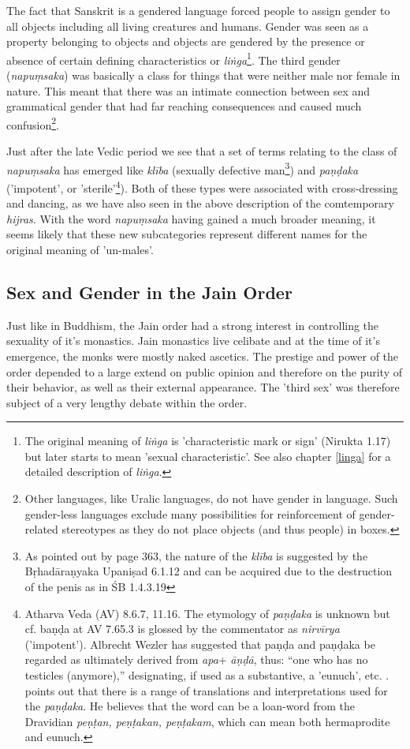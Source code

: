 The fact that Sanskrit is a gendered language forced people to assign gender to all objects including all living creatures and humans. Gender was seen as a property belonging to objects and objects are gendered by the presence or absence of certain defining characteristics or {\em liṅga}\footnote{The original meaning of {\em liṅga} is 'characteristic mark or sign' (Nirukta 1.17) but later starts to mean 'sexual characteristic'. See also chapter \ref{linga} for a detailed description of {\em liṅga}.}. The third gender ({\em napuṃsaka}) was basically a class for things that were neither male nor female in nature. This meant that there was an intimate connection between sex and grammatical gender that had far reaching consequences and caused much confusion\footnote{Other languages, like Uralic languages, do not have gender in language. Such gender-less languages exclude many possibilities for reinforcement of gender-related stereotypes as they do not place objects (and thus people) in boxes.}. 

Just after the late Vedic period we see that a set of terms relating to the class of {\em napuṃsaka} has emerged like {\em klība} (sexually defective man\footnote{As pointed out by \cite{zwilling} page 363, the nature of the {\em klība} is suggested by the Bṛhadāraṇyaka Upaniṣad 6.1.12 and can be acquired due to the destruction of the penis as in ŚB 1.4.3.19}) and {\em paṇḍaka} ('impotent', or 'sterile'\footnote{Atharva Veda (AV) 8.6.7, 11.16. The etymology of {\em paṇḍaka} is unknown but cf. baṇḍa at AV 7.65.3 is glossed by the commentator as {\em nirvīrya} ('impotent'). Albrecht Wezler has suggested that paṇḍa and paṇḍaka be regarded as ultimately derived from {\em *apa}+ {\em āṇḍā}, thus: “one who has no testicles (anymore),” designating, if used as a substantive, a 'eunuch', etc. \cite{wezler}. \cite{bomhard} points out that there is a range of translations and interpretations used for the {\em paṇḍaka}. He believes that the word can be a loan-word from the Dravidian {\em peṇṭan, peṇṭakan, peṇṭakam}, which can mean both hermaprodite and eunuch.}). Both of these types were associated with cross-dressing and dancing, as we have also seen in the above description of the comtemporary {\em hijras}. With the word {\em napuṃsaka} having gained a much broader meaning, it seems likely that these new subcategories represent different names for the original meaning of 'un-males'.

\subsection{Sex and Gender in the Jain Order}
Just like in Buddhism, the Jain order had a strong interest in controlling the sexuality of it's monastics. Jain monastics live celibate and at the time of it's emergence, the monks were mostly naked ascetics. The prestige and power of the order depended to a large extend on public opinion and therefore on the purity of their behavior, as well as their external appearance. The 'third sex' was therefore subject of a very lengthy debate within the order. 

